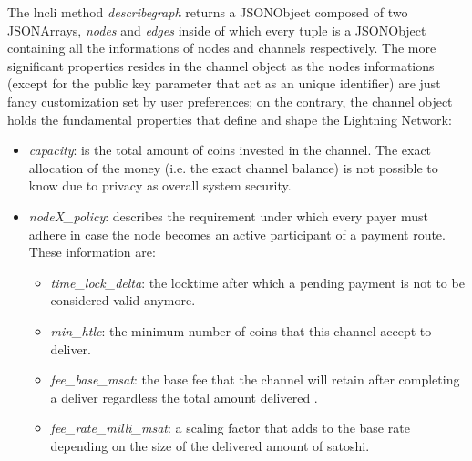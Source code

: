 	The lncli method \textit{describegraph} returns a JSONObject composed of two JSONArrays, \textit{nodes} and \textit{edges} inside of which every tuple is a JSONObject containing all the informations of nodes and channels respectively. The more significant properties resides in the channel object as the nodes informations (except for the public key parameter that act as an unique identifier) are just fancy customization set by user preferences; on the contrary, the channel object holds the fundamental properties that define and shape  the Lightning Network:
	\newpage
	\begin{itemize}
		\item \textit{capacity}: is the total amount of coins invested in the channel. The exact allocation of the money (i.e. the exact channel balance) is not possible to know due to privacy as overall system security.
		
		\item \textit{nodeX\_policy}: describes the requirement under which every payer must adhere in case the node becomes an active participant of a payment route. These information are:
		\begin{itemize}
			\item \textit{time\_lock\_delta}: the locktime after which a pending payment is not to be considered valid anymore.
			
			\item \textit{min\_htlc}: the minimum number of coins that this channel accept to deliver.
			
			\item \textit{fee\_base\_msat}: the base fee that the channel will retain after completing a deliver regardless the total amount delivered .
			
			\item \textit{fee\_rate\_milli\_msat}: a scaling factor that adds to the base rate depending on the size of the delivered amount of satoshi.
		\end{itemize}
	\end{itemize}

	
